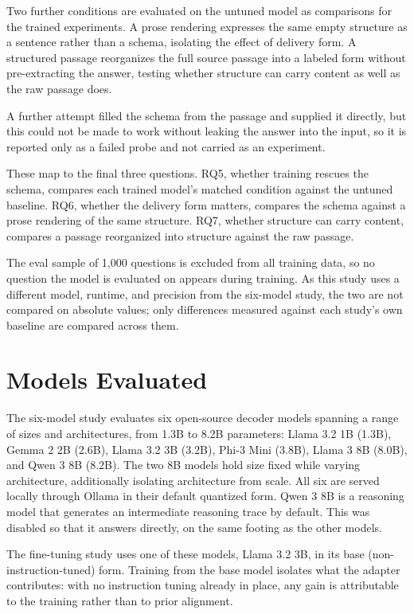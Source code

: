 \documentclass[master]{thesis}
\begin{document}
Two further conditions are evaluated on the untuned model as comparisons for the trained experiments. A prose rendering expresses the same empty structure as a sentence rather than a schema, isolating the effect of delivery form. A structured passage reorganizes the full source passage into a labeled form without pre-extracting the answer, testing whether structure can carry content as well as the raw passage does.

A further attempt filled the schema from the passage and supplied it directly, but this could not be made to work without leaking the answer into the input, so it is reported only as a failed probe and not carried as an experiment.

These map to the final three questions. RQ5, whether training rescues the schema, compares each trained model's matched condition against the untuned baseline. RQ6, whether the delivery form matters, compares the schema against a prose rendering of the same structure. RQ7, whether structure can carry content, compares a passage reorganized into structure against the raw passage.

The eval sample of 1,000 questions is excluded from all training data, so no question the model is evaluated on appears during training. As this study uses a different model, runtime, and precision from the six-model study, the two are not compared on absolute values; only differences measured against each study's own baseline are compared across them.

\section{Models Evaluated}

The six-model study evaluates six open-source decoder models spanning a range of sizes and architectures, from 1.3B to 8.2B parameters: Llama 3.2 1B (1.3B), Gemma 2 2B (2.6B), Llama 3.2 3B (3.2B), Phi-3 Mini (3.8B), Llama 3 8B (8.0B), and Qwen 3 8B (8.2B). The two 8B models hold size fixed while varying architecture, additionally isolating architecture from scale. All six are served locally through Ollama in their default quantized form. Qwen 3 8B is a reasoning model that generates an intermediate reasoning trace by default. This was disabled so that it answers directly, on the same footing as the other models.

The fine-tuning study uses one of these models, Llama 3.2 3B, in its base (non-instruction-tuned) form. Training from the base model isolates what the adapter contributes: with no instruction tuning already in place, any gain is attributable to the training rather than to prior alignment.
\end{document}
